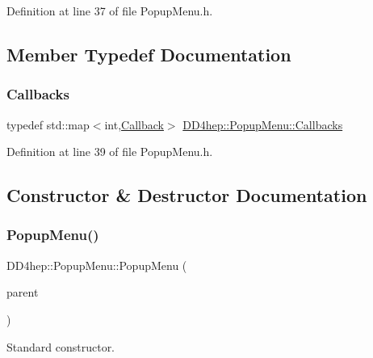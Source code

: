 Definition at line 37 of file Popup\+Menu.\+h.



\subsection{Member Typedef Documentation}
\hypertarget{class_d_d4hep_1_1_popup_menu_aea53283ce44fa4935d8b7a3751ad1b5b}{}\label{class_d_d4hep_1_1_popup_menu_aea53283ce44fa4935d8b7a3751ad1b5b} 
\subsubsection{\texorpdfstring{Callbacks}{Callbacks}}
{\footnotesize\ttfamily typedef std\+::map$<$int,\hyperlink{class_d_d4hep_1_1_callback}{Callback}$>$ \hyperlink{class_d_d4hep_1_1_popup_menu_aea53283ce44fa4935d8b7a3751ad1b5b}{D\+D4hep\+::\+Popup\+Menu\+::\+Callbacks}}



Definition at line 39 of file Popup\+Menu.\+h.



\subsection{Constructor \& Destructor Documentation}
\hypertarget{class_d_d4hep_1_1_popup_menu_afaf85050694a622a0f3f62e2622bc5e9}{}\label{class_d_d4hep_1_1_popup_menu_afaf85050694a622a0f3f62e2622bc5e9} 
\subsubsection{\texorpdfstring{Popup\+Menu()}{PopupMenu()}}
{\footnotesize\ttfamily D\+D4hep\+::\+Popup\+Menu\+::\+Popup\+Menu (\begin{DoxyParamCaption}\item[{const T\+G\+Window $\ast$}]{parent }\end{DoxyParamCaption})}



Standard constructor. 

\hypertarget{class_d_d4hep_1_1_popup_menu_aabdf2cc11c5e3cb57049041c459082fd}{}\label{class_d_d4hep_1_1_popup_menu_aabdf2cc11c5e3cb57049041c459082fd} 

